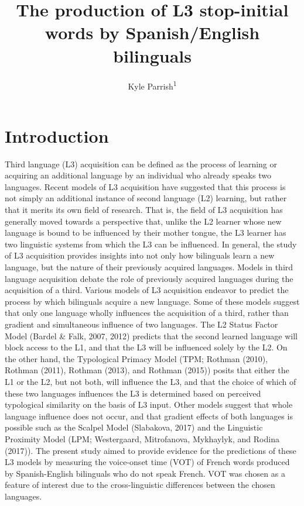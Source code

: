 \documentclass[
  english,
  man]{apa6}
\title{The production of L3 stop-initial words by Spanish/English bilinguals}
\author{Kyle Parrish\textsuperscript{1}}
\date{}
\affiliation{\vspace{0.5cm}\textsuperscript{1} Rutgers University}
\begin{document}
\maketitle

\hypertarget{introduction}{%
\section{Introduction}\label{introduction}}

Third language (L3) acquisition can be defined as the process of learning or acquiring an additional language by an individual who already speaks two languages.
Recent models of L3 acquisition have suggested that this process is not simply an additional instance of second language (L2) learning, but rather that it merits its own field of research.
That is, the field of L3 acquisition has generally moved towards a perspective that, unlike the L2 learner whose new language is bound to be influenced by their mother tongue, the L3 learner has two linguistic systems from which the L3 can be influenced.
In general, the study of L3 acquisition provides insights into not only how bilinguals learn a new language, but the nature of their previously acquired languages.
Models in third language acquisition debate the role of previously acquired languages during the acquisition of a third.
Various models of L3 acquisition endeavor to predict the process by which bilinguals acquire a new language.
Some of these models suggest that only one language wholly influences the acquisition of a third, rather than gradient and simultaneous influence of two languages.
The L2 Status Factor Model (Bardel \& Falk, 2007, 2012) predicts that the second learned language will block access to the L1, and that the L3 will be influenced solely by the L2.
On the other hand, the Typological Primacy Model (TPM; Rothman (2010), Rothman (2011), Rothman (2013), and Rothman (2015)) posits that either the L1 or the L2, but not both, will influence the L3, and that the choice of which of these two languages influences the L3 is determined based on perceived typological similarity on the basis of L3 input.
Other models suggest that whole language influence does not occur, and that gradient effects of both languages is possible such as the Scalpel Model (Slabakova, 2017) and the Linguistic Proximity Model (LPM; Westergaard, Mitrofanova, Mykhaylyk, and Rodina (2017)).
The present study aimed to provide evidence for the predictions of these L3 models by measuring the voice-onset time (VOT) of French words produced by Spanish-English bilinguals who do not speak French. VOT was chosen as a feature of interest due to the cross-linguistic differences between the chosen languages.
\end{document}
